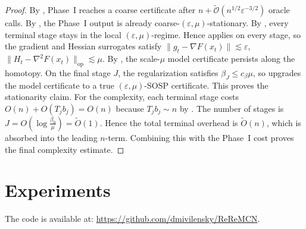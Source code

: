 \documentclass{article}
\theoremstyle{plain}
\theoremstyle{definition}
\theoremstyle{remark}
\begin{document}
\begin{proof}
By , Phase~I reaches a coarse certificate after
$
n+\widetilde{\mathcal O}\!\left(n^{1/2}\varepsilon^{-3/2}\right)
$
oracle calls. By , the Phase~I output is already coarse-\((\varepsilon,\mu)\)-stationary. By , every terminal stage stays in the local \((\varepsilon,\mu)\)-regime. Hence  applies on every stage, so the gradient and Hessian surrogates satisfy $
\|g_t-\nabla F(x_t)\|\lesssim \varepsilon$,
$\|H_t-\nabla^2F(x_t)\|_{\mathrm{op}}\lesssim \mu$.
By , the scale-\(\mu\) model certificate persists along the homotopy. On the final stage \(J\), the regularization satisfies \(\beta_J\le c_\beta\mu\), so  upgrades the model certificate to a true \((\varepsilon,\mu)\)-SOSP certificate. This proves the stationarity claim. For the complexity, each terminal stage costs $
O(n)+O(T_jb_j)=O(n)
$
because \(T_jb_j\sim n\) by . The number of stages is
$
J=O\!\left(\log\frac{\beta_0}{\mu}\right)=\widetilde O(1).
$
Hence the total terminal overhead is \(\widetilde O(n)\), which is absorbed into the leading \(n\)-term. Combining this with the Phase~I cost proves the final complexity estimate.
\end{proof}



\section{Experiments}\label{sec:experiments}


The code is available at: \url{https://github.com/dmivilensky/ReReMCN}.
\end{document}
